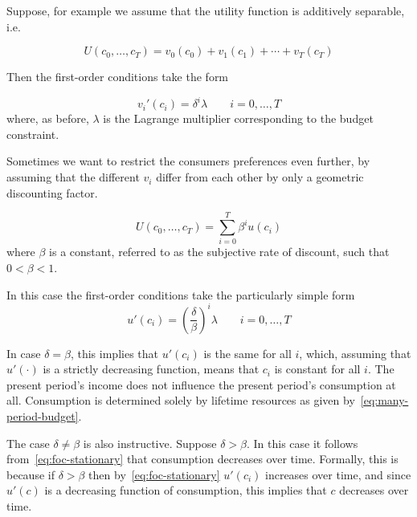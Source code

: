 \documentclass[12pt,reqno,openany]{amsbook}
\theoremstyle{plain}
\theoremstyle{definition}
\begin{document}
Suppose, for example we assume that the utility function is additively
separable, i.e.

\begin{equation}\label{eq:utility-addsep}
U(c_0,\ldots,c_T)=v_0(c_0)+v_1(c_1)+\cdots+v_T(c_T)
\end{equation}

Then the first-order conditions take the form

\begin{equation}\label{eq:foc-additively-separable}
v_i'(c_i) = \delta^i \lambda \qquad i=0,\ldots,T
\end{equation}
where, as before, $\lambda$ is the Lagrange multiplier corresponding
to the budget constraint.

Sometimes we want to restrict the consumers preferences even further,
by assuming that the different $v_i$ differ from each other by only a
geometric discounting factor.

\begin{equation}\label{eq:utility-geometric}
U(c_0,\ldots,c_T)=\sum_{i=0}^T \beta^i u(c_i)
\end{equation}
where $\beta$ is a constant, referred to as the subjective rate of
discount, such that $0<\beta<1$.  

In this case the first-order conditions take the particularly simple
form
\begin{equation}\label{eq:foc-stationary}
u'(c_i)=\left(\frac{\delta}{\beta}\right)^i \lambda \qquad i=0,\ldots,T
\end{equation}

In case $\delta=\beta$, this implies that $u'(c_i)$ is the same for
all $i$, which, assuming that $u'(\cdot)$ is a strictly decreasing
function, means that $c_i$ is constant for all $i$. The present
period's income does not influence the present period's consumption at
all. Consumption is determined solely by lifetime resources as given
by~\eqref{eq:many-period-budget}.

The case $\delta \neq \beta$ is also instructive. Suppose
$\delta>\beta$. In this case it follows from~\eqref{eq:foc-stationary}
that consumption decreases over time. Formally, this is because if
$\delta>\beta$ then by~\eqref{eq:foc-stationary} $u'(c_i)$ increases
over time, and since $u'(c)$ is a decreasing function of consumption,
this implies that $c$ decreases over time. 
\end{document}
